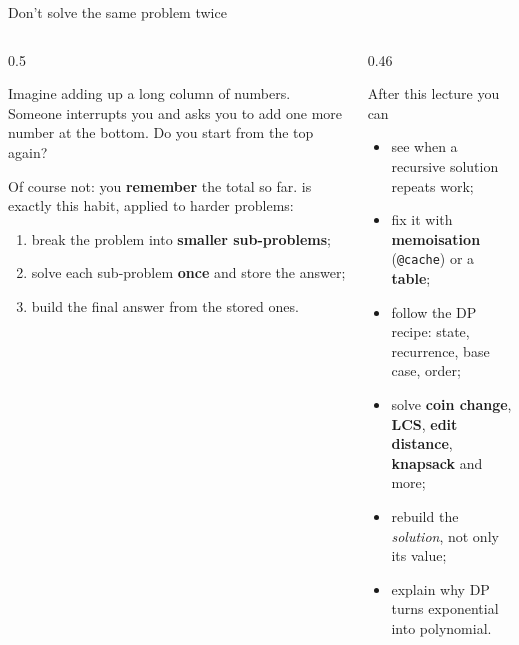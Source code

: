 \documentclass[aspectratio=169,10pt]{beamer}
\begin{document}
\begin{frame}[plain]\titlepage\end{frame}

\begin{frame}{Don't solve the same problem twice}
\begin{columns}[T]
\begin{column}{0.5\textwidth}
{\small
Imagine adding up a long column of numbers. Someone interrupts you and asks you to add one more number at the bottom. Do you start from the top again?

\vspace{2mm}
Of course not: you \textbf{remember} the total so far.  is exactly this habit, applied to harder problems:
\begin{enumerate}\setlength\itemsep{2pt}
\item break the problem into \textbf{smaller sub-problems};
\item solve each sub-problem \textbf{once} and store the answer;
\item build the final answer from the stored ones.
\end{enumerate}}
\end{column}
\begin{column}{0.46\textwidth}
\begin{block}{After this lecture you can}
{\small
\begin{itemize}\setlength\itemsep{2pt}
\item see when a recursive solution repeats work;
\item fix it with \textbf{memoisation} (\texttt{@cache}) or a \textbf{table};
\item follow the DP recipe: state, recurrence, base case, order;
\item solve \textbf{coin change}, \textbf{LCS}, \textbf{edit distance}, \textbf{knapsack} and more;
\item rebuild the \emph{solution}, not only its value;
\item explain why DP turns exponential into polynomial.
\end{itemize}}
\end{block}
\end{column}
\end{columns}
\end{frame}
\end{document}
